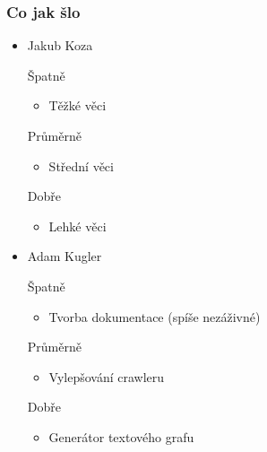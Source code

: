 \documentclass{beamer}
\begin{document}
\begin{frame}[allowframebreaks]\frametitle{Co jak šlo}
  \begin{itemize}
    \item Jakub Koza
     \begin{block}{Špatně} %
       \begin{itemize}
        \item Těžké věci
       \end{itemize}
     \end{block}
     \begin{block}{Průměrně} %
        \begin{itemize}
        \item Střední věci
       \end{itemize}
     \end{block}
     \begin{block}{Dobře} %
       \begin{itemize}
        \item Lehké věci
       \end{itemize}
     \end{block}
   
    \item Adam Kugler
      \begin{block}{Špatně} %
       \begin{itemize}
        \item Tvorba dokumentace (spíše nezáživné)
       \end{itemize}
     \end{block}
     \begin{block}{Průměrně} %
        \begin{itemize}
        \item Vylepšování crawleru
       \end{itemize}
     \end{block}
     \begin{block}{Dobře} %
       \begin{itemize}
        \item Generátor textového grafu
       \end{itemize}
     \end{block}
  

\end{itemize}
\end{frame}
\end{document}
